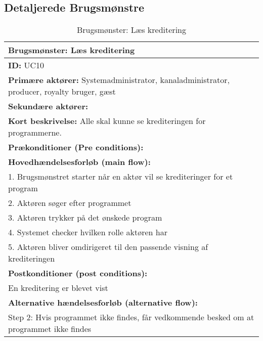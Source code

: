 \subsection{Detaljerede Brugsmønstre}

\begin{table}[H]
    \begin{tabularx}{\textwidth}{|X|}
        \hline
        \textbf{Brugsmønster:}  Læs kreditering \\ 
        \hline
    	\textbf{ID:} UC10 \\ 
    	\hline
    	\textbf{Primære aktører:} Systemadministrator, kanaladministrator, producer, royalty bruger, gæst \\ \hline
    	\textbf{Sekundære aktører:} \\ \hline
    	\textbf{Kort beskrivelse:} Alle skal kunne se krediteringen for programmerne. \\ \hline
    	\textbf{Prækonditioner (Pre conditions):} \\ \hline
        \textbf{Hovedhændelsesforløb (main flow):} \\
        1. Brugsmønstret starter når en aktør vil se krediteringer for et program \\
        2. Aktøren søger efter programmet \\
        3. Aktøren trykker på det ønskede program \\
        4. Systemet checker hvilken rolle aktøren har \\
        5. Aktøren bliver omdirigeret til den passende visning af krediteringen \\ \hline
            \textbf{Postkonditioner (post conditions):} \\
            En kreditering er blevet vist \\ \hline
        
        	\textbf{Alternative hændelsesforløb (alternative flow):} \\
        Step 2: Hvis programmet ikke findes, får vedkommende besked om at programmet ikke findes \\ 
        \hline
    \end{tabularx}
    \caption{Brugsmønster: Læs kreditering}
    \label{table:read_credits}
\end{table}

